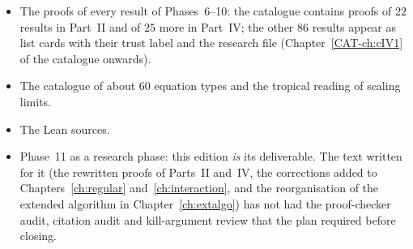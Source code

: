 \begin{itemize}
\item The proofs of every result of Phases~6--10: the catalogue contains proofs of $22$ results in Part~II and of $25$ more in Part~IV; the other $86$ results appear as list cards with their trust label and the research file (Chapter~\ref{CAT-ch:cIV1} of the catalogue onwards).
\item The catalogue of about $60$ equation types and the tropical reading of scaling limits.
\item The Lean sources.
\item Phase~11 as a research phase: this edition \emph{is} its deliverable. The text written for it (the rewritten proofs of Parts~II and~IV, the corrections added to Chapters~\ref{ch:regular} and~\ref{ch:interaction}, and the reorganisation of the extended algorithm in Chapter~\ref{ch:extalgo}) has not had the proof-checker audit, citation audit and kill-argument review that the plan required before closing.
\end{itemize}
